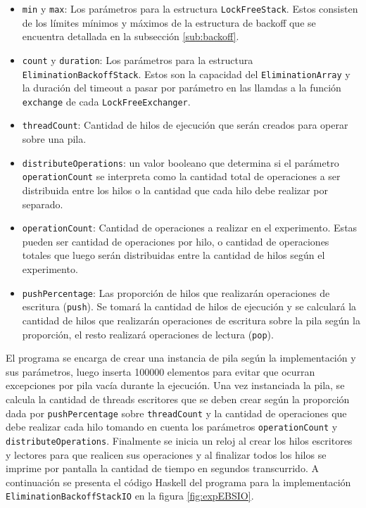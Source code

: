 \begin{itemize}
    \item \texttt{min} y \texttt{max}: Los parámetros para la estructura \texttt{LockFreeStack}. Estos consisten de los límites mínimos y máximos de la estructura de backoff que se encuentra detallada en la subsección \ref{sub:backoff}.
    \item \texttt{count} y \texttt{duration}: Los parámetros para la estructura \texttt{EliminationBackoffStack}. Estos son la capacidad del \texttt{EliminationArray} y la duración del timeout a pasar por parámetro en las llamdas a la función \texttt{exchange} de cada \texttt{LockFreeExchanger}.
    \item \texttt{threadCount}: Cantidad de hilos de ejecución que serán creados para operar sobre una pila.
    \item \texttt{distributeOperations}: un valor booleano que determina si el parámetro \texttt{operationCount} se interpreta como la cantidad total de operaciones a ser distribuida entre los hilos o la cantidad que cada hilo debe realizar por separado.
    \item \texttt{operationCount}: Cantidad de operaciones a realizar en el experimento. Estas pueden ser cantidad de operaciones por hilo, o cantidad de operaciones totales que luego serán distribuidas entre la cantidad de hilos según el experimento.
    \item \texttt{pushPercentage}: Las proporción de hilos que realizarán operaciones de escritura (\texttt{push}). Se tomará la cantidad de hilos de ejecución y se calculará la cantidad de hilos que realizarán operaciones de escritura sobre la pila según la proporción, el resto realizará operaciones de lectura (\texttt{pop}).
\end{itemize}

El programa se encarga de crear una instancia de pila según la implementación y sus parámetros, luego inserta 100000 elementos para evitar que ocurran excepciones por pila vacía durante la ejecución. Una vez instanciada la pila, se calcula la cantidad de threads escritores que se deben crear según la proporción dada por \texttt{pushPercentage} sobre \texttt{threadCount} y la cantidad de operaciones que debe realizar cada hilo tomando en cuenta los parámetros \texttt{operationCount} y \texttt{distributeOperations}. Finalmente se inicia un reloj al crear los hilos escritores y lectores para que realicen sus operaciones y al finalizar todos los hilos se imprime por pantalla la cantidad de tiempo en segundos transcurrido. A continuación se presenta el código Haskell del programa para la implementación \texttt{EliminationBackoffStackIO} en la figura \ref{fig:expEBSIO}.

